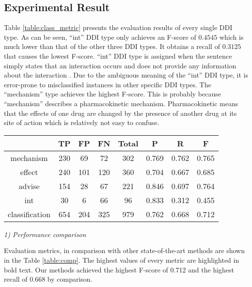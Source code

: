 \documentclass[conference]{IEEEtran}
\begin{document}
\subsection{Experimental Result}

Table \ref{table:class_metric} presents the evaluation results of every single DDI type.
As can be seen, ``int'' DDI type only achieves an F-score of $0.4545$ which is much lower than that of the other three DDI types.
It obtains a recall of $0.3125$ that causes the lowest F-score.
``int'' DDI type is assigned when the sentence simply states that an interaction occurs
and does not provide any information about the interaction \cite{segura-bedmar_semeval-2013_2013}.
Due to the ambiguous meaning of the ``int'' DDI type, it is error-prone to misclassified instances in other specific DDI types.
The ``mechanism'' type achieves the highest F-score. This is probably because ``mechanism'' describes a pharmacokinetic mechanism.
Pharmacokinetic means that the effects of one drug are changed by the presence of another drug at its site of action which is relatively not easy to confuse.

\begin{table*}
\caption{Detailed evaluation metrics of DDI-UGC.}
\label{table:class_metric}
\begin{center}
\begin{tabular}{cccccccc}
\hline
& TP & FP & FN & Total &P & R & F \\\hline
mechanism &  230 & 69 & 72 & 302 & 0.769 & 0.762 & 0.765\\
effect &  240 & 101 & 120 & 360 & 0.704 & 0.667 & 0.685\\
advise &  154 & 28 & 67 & 221 & 0.846 & 0.697 & 0.764 \\
int &  30 & 6 & 66 & 96 & 0.833 & 0.312 & 0.455\\
classification & 654 & 204 & 325 & 979 & 0.762 & 0.668 & 0.712\\
\hline
\end{tabular}
\end{center}
\end{table*}

\bigbreak
\emph{1) Performance comparison}
\bigbreak

Evaluation metrics, in comparison with other state-of-the-art methods are shown in the Table \ref{table:comp}.
The highest values of every metric are highlighted in bold text.
Our methods achieved the highest F-score of 0.712 and the highest recall of 0.668 by comparison.
\end{document}
